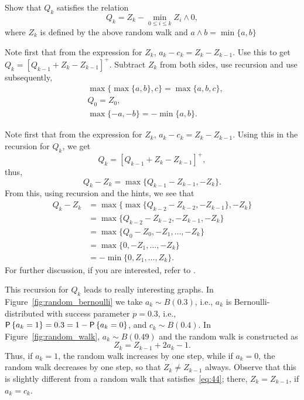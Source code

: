 \begin{exercise}
Show that  $Q_k$ satisfies the relation
\begin{equation}\label{eq:reich1}
  Q_k = Z_k - \min_{0\leq i \leq k} Z_i\wedge 0,
\end{equation}
where $Z_k$ is defined by the above random walk and
$a\wedge b = \min\{a,b\}$ 
\begin{hint}
Note first that from the expression for $Z_k$,
  $a_k - c_k = Z_k - Z_{k-1}$. Use this to get
  $Q_k = [Q_{k-1} +Z_k- Z_{k-1}]^+$. Subtract $Z_k$ from both sides, use recursion and
  use subsequently,
\begin{align*}
&\max\{\max\{a,b\}, c\} = \max\{a,b,c\}, \\
&Q_0 = Z_0, \\
&\max\{-a, -b \} = -\min\{a,b\}.
\end{align*}
\end{hint}
\begin{solution}
Note first that from the expression
for $Z_k$, $a_k - c_k = Z_k - Z_{k-1}$. Using this in the recursion
for $Q_k$, we get
\begin{equation*}
  Q_k = [Q_{k-1} +Z_k- Z_{k-1}]^+,
\end{equation*}
thus, 
\begin{equation*}
  Q_k - Z_{k} = \max\{Q_{k-1} - Z_{k-1}, -Z_k\}.
\end{equation*}
From this, using recursion and the hints, we see that
\begin{equation*}
  \begin{split}
  Q_k - Z_{k} 
&= \max\{\max\{Q_{k-2} - Z_{k-2}, -Z_{k-1}\}, -Z_k\} \\
&= \max\{Q_{k-2} - Z_{k-2}, -Z_{k-1}, -Z_k\} \\
&= \max\{Q_{0} - Z_{0}, -Z_1, \ldots, -Z_k\} \\
&= \max\{0, -Z_1, \ldots, -Z_k\} \\
&= - \min\{0, Z_1, \ldots, Z_k\}.
  \end{split}
  \end{equation*}
For further discussion, if you are interested, refer to
  \citet{baccelli88:_sampl_m_m}.
\end{solution}
\end{exercise}

This recursion for $Q_k$ leads to really interesting graphs. In Figure~\ref{fig:random_bernoulli}
 we take $a_k \sim B(0.3)$, i.e., $a_k$ is Bernoulli-distributed with success
parameter $p=0.3$, i.e., $\P{a_k = 1} = 0.3 = 1- \P{a_k=0}$, and
$c_k \sim B(0.4)$. In Figure~\ref{fig:random_walk},  $a_k\sim B(0.49)$ and
the random walk is constructed as
\begin{equation}\label{eq:51}
  Z_k = Z_{k-1} + 2 a_k -1.
\end{equation}
Thus, if $a_k=1$, the random walk increases by one step, while if $a_k=0$, the random walk decreases by one step, so that $Z_k \neq Z_{k-1}$  always. Observe that this is slightly different from a random walk that satisfies~\eqref{eq:44}; there, $Z_{k}=Z_{k-1}$, if $a_k=c_k$.


